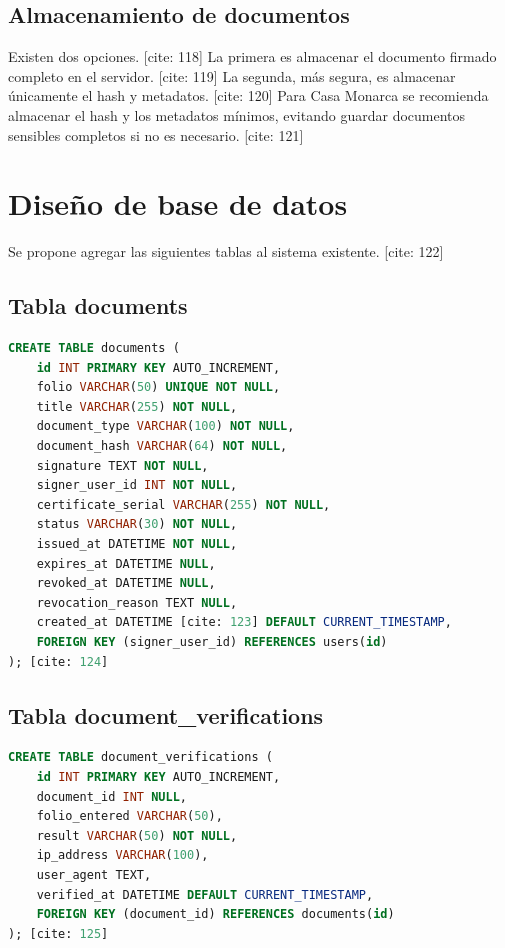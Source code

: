 \documentclass[10pt]{article} [cite: 1]
\begin{document}
\subsection{Almacenamiento de documentos}

Existen dos opciones. [cite: 118] La primera es almacenar el documento firmado completo en el servidor. [cite: 119] La segunda, más segura, es almacenar únicamente el hash y metadatos. [cite: 120] Para Casa Monarca se recomienda almacenar el hash y los metadatos mínimos, evitando guardar documentos sensibles completos si no es necesario. [cite: 121]

\section{Diseño de base de datos}

Se propone agregar las siguientes tablas al sistema existente. [cite: 122]

\subsection{Tabla documents}

\begin{lstlisting}[language=SQL]
CREATE TABLE documents (
    id INT PRIMARY KEY AUTO_INCREMENT,
    folio VARCHAR(50) UNIQUE NOT NULL,
    title VARCHAR(255) NOT NULL,
    document_type VARCHAR(100) NOT NULL,
    document_hash VARCHAR(64) NOT NULL,
    signature TEXT NOT NULL,
    signer_user_id INT NOT NULL,
    certificate_serial VARCHAR(255) NOT NULL,
    status VARCHAR(30) NOT NULL,
    issued_at DATETIME NOT NULL,
    expires_at DATETIME NULL,
    revoked_at DATETIME NULL,
    revocation_reason TEXT NULL,
    created_at DATETIME [cite: 123] DEFAULT CURRENT_TIMESTAMP,
    FOREIGN KEY (signer_user_id) REFERENCES users(id)
); [cite: 124] 
\end{lstlisting}

\subsection{Tabla document\_verifications}

\begin{lstlisting}[language=SQL]
CREATE TABLE document_verifications (
    id INT PRIMARY KEY AUTO_INCREMENT,
    document_id INT NULL,
    folio_entered VARCHAR(50),
    result VARCHAR(50) NOT NULL,
    ip_address VARCHAR(100),
    user_agent TEXT,
    verified_at DATETIME DEFAULT CURRENT_TIMESTAMP,
    FOREIGN KEY (document_id) REFERENCES documents(id)
); [cite: 125] 
\end{lstlisting}
\end{document}
